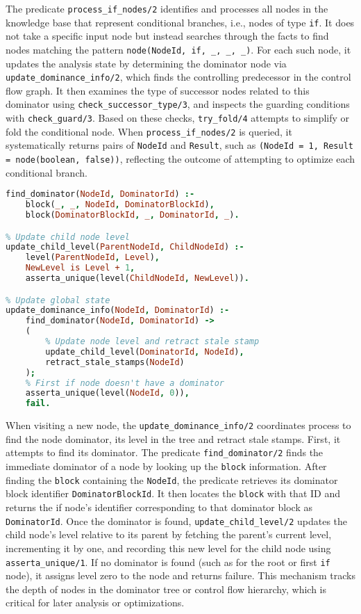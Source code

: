 The predicate \texttt{process\_if\_nodes/2} identifies and processes all nodes in the knowledge base that represent conditional branches, i.e., nodes of type \texttt{if}. It does not take a specific input node but instead searches through the facts to find nodes matching the pattern \texttt{node(NodeId, if, \_, \_, \_)}.
For each such node, it updates the analysis state by determining the dominator node via \texttt{update\_dominance\_info/2}, which finds the controlling predecessor in the control flow graph. It then examines the type of successor nodes related to this dominator using \texttt{check\_successor\_type/3}, and inspects the guarding conditions with \texttt{check\_guard/3}. Based on these checks, \texttt{try\_fold/4} attempts to simplify or fold the conditional node.  When \texttt{process\_if\_nodes/2} is queried, it systematically returns pairs of \texttt{NodeId} and \texttt{Result}, such as \texttt{(NodeId = 1, Result = node(boolean, false))}, reflecting the outcome of attempting to optimize each conditional branch.

\smallbreak
\begin{lstlisting}[language=Prolog]
% Predicate to find dominator of a block
find_dominator(NodeId, DominatorId) :-
    block(_, _, NodeId, DominatorBlockId),
    block(DominatorBlockId, _, DominatorId, _).

% Update child node level
update_child_level(ParentNodeId, ChildNodeId) :-
    level(ParentNodeId, Level),
    NewLevel is Level + 1,
    asserta_unique(level(ChildNodeId, NewLevel)).

% Update global state
update_dominance_info(NodeId, DominatorId) :-
    find_dominator(NodeId, DominatorId) ->
    (
        % Update node level and retract stale stamp
        update_child_level(DominatorId, NodeId),
        retract_stale_stamps(NodeId)
    );
    % First if node doesn't have a dominator
    asserta_unique(level(NodeId, 0)),
    fail.
\end{lstlisting}

When visiting a new node, the \texttt{update\_dominance\_info/2} coordinates process to find the node dominator, its level in the tree and retract stale stamps. First, it attempts to find its dominator. 
The predicate \texttt{find\_dominator/2} finds the immediate dominator of a node by looking up the \texttt{block} information.
After finding the \texttt{block} containing the \texttt{NodeId}, the predicate retrieves its dominator block identifier \texttt{DominatorBlockId}.
It then locates the \texttt{block} with that ID and returns the if node's identifier corresponding to that dominator block as \texttt{DominatorId}. 
Once the dominator is found, \texttt{update\_child\_level/2} updates the child node’s level relative to its parent by fetching the parent’s current level, incrementing it by one, and recording this new level for the child node using \texttt{asserta\_unique/1}. 
If no dominator is found (such as for the root or first \texttt{if} node), it assigns level zero to the node and returns failure. 
This mechanism tracks the depth of nodes in the dominator tree or control flow hierarchy, which is critical for later analysis or optimizations.

